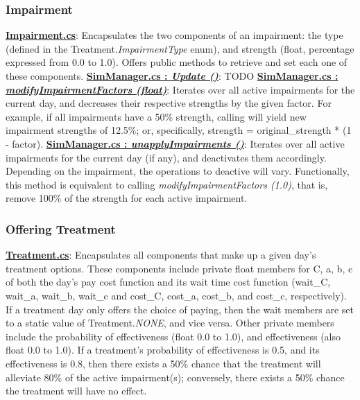 \documentclass{article}
\begin{document}
\subsubsection{Impairment} %
\href{https://bit.ly/2JFJ9mj}{\textbf{Impairment.cs}}: Encapsulates the two components of an impairment: the type (defined in the Treatment.\textit{ImpairmentType} enum), and strength (float, percentage expressed from 0.0 to 1.0). Offers public methods to retrieve and set each one of these components. \newline \newline
\href{https://bit.ly/2UhmSzq}{\textbf{SimManager.cs : \textit{Update ()}}}: TODO \newline \newline %
\href{https://bit.ly/2UhmSzq}{\textbf{SimManager.cs : \textit{modifyImpairmentFactors (float)}}}: Iterates over all active impairments for the current day, and decreases their respective strengths by the given factor. For example, if all impairments have a 50\% strength, calling  will yield new impairment strengths of 12.5\%; or, specifically, strength = original\_strength * (1 - factor).  \newline \newline
\href{https://bit.ly/2UhmSzq}{\textbf{SimManager.cs : \textit{unapplyImpairments ()}}}: Iterates over all active impairments for the current day (if any), and deactivates them accordingly. Depending on the impairment, the operations to deactive will vary. Functionally, this method is equivalent to calling \textit{modifyImpairmentFactors (1.0)}, that is, remove 100\% of the strength for each active impairment. 

\subsubsection{Offering Treatment} %
\href{https://bit.ly/2TwrvAZ}{\textbf{Treatment.cs}}: Encapsulates all components that make up a given day's treatment options. These components include private float members for C, a, b, c of both the day's pay cost function and its wait time cost function (wait\_C, wait\_a, wait\_b, wait\_c and cost\_C, cost\_a, cost\_b, and cost\_c, respectively). If a treatment day only offers the choice of paying, then the wait members are set to a static value of Treatment.\textit{NONE}, and vice versa. Other private members include the probability of effectiveness (float 0.0 to 1.0), and effectiveness (also float 0.0 to 1.0). If a treatment's probability of effectiveness is 0.5, and its effectiveness is 0.8, then there exists a 50\% chance that the treatment will alleviate 80\% of the active impairment(s); conversely, there exists a 50\% chance the treatment will have no effect.
\end{document}
